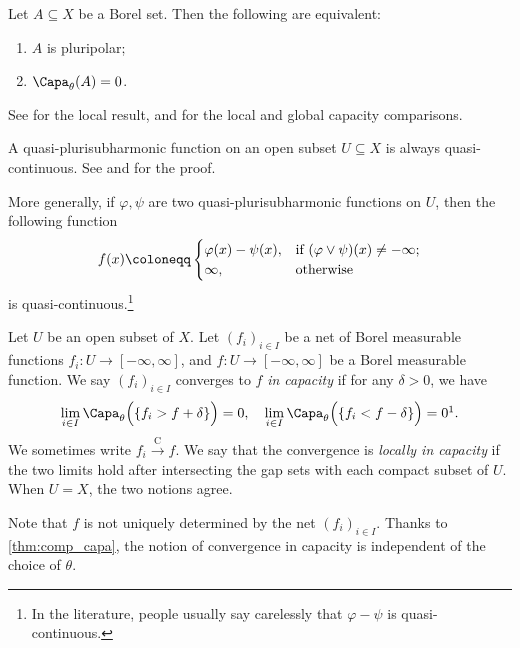 \begin{theorem}\label{thm:pp_cap}
    Let $A\subseteq X$ be a Borel set. Then the following are equivalent:
    \begin{enumerate}
        \item\label{itm:thm:pp_cap:1} $A$ is pluripolar;
        \item\label{itm:thm:pp_cap:2} $\Capa_{\theta}(A)=0$.
    \end{enumerate}
\end{theorem}
See \cite[Theorem~4.40]{GZ17} for the local result, and \cite[Theorem~10.1.4 and Proposition~16.9.9]{FPT} for the local and global capacity comparisons.


\begin{example}\label{ex:psh_qc}
    A quasi-plurisubharmonic function on an open subset $U\subseteq X$ is always quasi-continuous. See \cite[Theorem~4.20]{GZ17} and \cite[Theorem~9.4.2 and Proposition~16.9.9]{FPT} for the proof.

    More generally, if $\varphi,\psi$ are two quasi-plurisubharmonic functions on $U$, then the following function
    \[
    f(x)\coloneqq \begin{cases}
        \varphi(x)-\psi(x),&\textup{if }(\varphi\lor \psi)(x)\neq -\infty;\\
        \infty,&\textup{otherwise}
    \end{cases}
    \]
    is quasi-continuous.\footnote{In the literature, people usually say carelessly that $\varphi-\psi$ is quasi-continuous.}
\end{example}

\begin{definition}\label{def:conv_cap}
Let $U$ be an open subset of $X$.
    Let $(f_i)_{i\in I}$ be a net of Borel measurable functions $f_i\colon U\rightarrow [-\infty,\infty]$, and $f\colon U\rightarrow [-\infty,\infty]$ be a Borel measurable function. We say $(f_i)_{i\in I}$ converges to $f$ \emph{in capacity} if for any $\delta>0$, we have
    \[
        \lim_{i\in I} \Capa_{\theta}\Bigl( \{f_i>f+\delta\} \Bigr)=0,\quad \lim_{i\in I} \Capa_{\theta}\Bigl( \{f_i<f-\delta\} \Bigr)=0\footnotemark.
    \]
    We sometimes write $f_i\xrightarrow{\mathrm{C}} f$. We say that the convergence is \emph{locally in capacity} if the two limits hold after intersecting the gap sets with each compact subset of $U$. When $U=X$, the two notions agree.
\end{definition}
Note that $f$ is not uniquely determined by the net $(f_i)_{i\in I}$. Thanks to \cref{thm:comp_capa}, the notion of convergence in capacity is independent of the choice of $\theta$.

